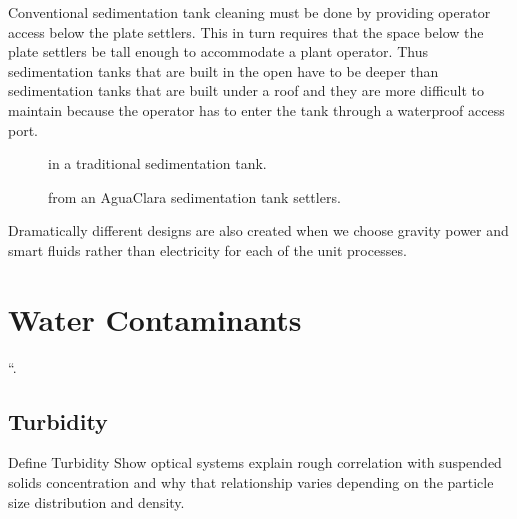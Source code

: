 \documentclass[letterpaper,10pt,english]{sphinxmanual}
\let\sphinxpxdimen\pdfpxdimen\else\newdimen\sphinxpxdimen
\begin{document}
Conventional sedimentation tank cleaning must be done by providing operator access below the plate settlers. This in turn requires that the space below the plate settlers be tall enough to accommodate a plant operator. Thus sedimentation tanks that are built in the open have to be deeper than sedimentation tanks that are built under a roof and they are more difficult to maintain because the operator has to enter the tank through a waterproof access port.

\begin{figure}[htbp]
\centering
\capstart

\noindent\sphinxincludegraphics[width=300\sphinxpxdimen]{{0}.jpg}
\caption{ in a traditional sedimentation tank.}\label{\detokenize{Introduction/Introduction:id19}}\label{\detokenize{Introduction/Introduction:figure-cleaning-a-sed-tank-with-fixed-plates}}\end{figure}

\begin{figure}[htbp]
\centering
\capstart

\noindent\sphinxincludegraphics[width=300\sphinxpxdimen]{{01}.jpg}
\caption{ from an AguaClara sedimentation tank settlers.}\label{\detokenize{Introduction/Introduction:id20}}\end{figure}

Dramatically different designs are also created when we choose gravity power and smart fluids rather than electricity for each of the unit processes.


\section{Water Contaminants}
\label{\detokenize{Introduction/Introduction:water-contaminants}}\label{\detokenize{Introduction/Introduction:heading-water-contaminants}}
“.


\subsection{Turbidity}
\label{\detokenize{Introduction/Introduction:turbidity}}\label{\detokenize{Introduction/Introduction:heading-turbidity}}
Define Turbidity
Show optical systems
explain rough correlation with suspended solids concentration and why that relationship varies depending on the particle size distribution and density.
\end{document}
